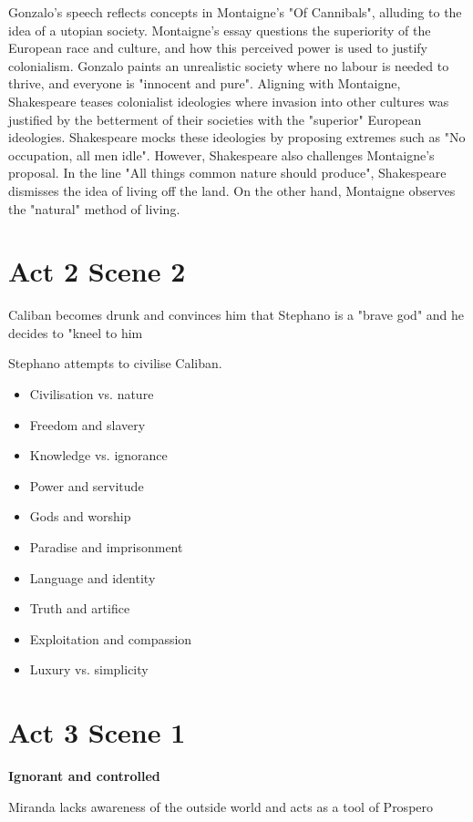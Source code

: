 	Gonzalo's speech reflects concepts in Montaigne's "Of Cannibals", alluding to the idea of a utopian society. Montaigne's essay questions the superiority of the European race and culture, and how this perceived power is used to justify colonialism. Gonzalo paints an unrealistic society where no labour is needed to thrive, and everyone is "innocent and pure". Aligning with Montaigne, Shakespeare teases colonialist ideologies where invasion into other cultures was justified by the betterment of their societies with the "superior" European ideologies. Shakespeare mocks these ideologies by proposing extremes such as "No occupation, all men idle". However, Shakespeare also challenges Montaigne's proposal. In the line "All things common nature should produce", Shakespeare dismisses the idea of living off the land. On the other hand, Montaigne observes the "natural" method of living.

\section{Act 2 Scene 2}

	Caliban becomes drunk and convinces him that Stephano is a "brave god" and he decides to "kneel to him

	Stephano attempts to civilise Caliban.

	\begin{itemize}
		\item Civilisation vs. nature
		\item Freedom and slavery
		\item Knowledge vs. ignorance
		\item Power and servitude
		\item Gods and worship
		\item Paradise and imprisonment
		\item Language and identity
		\item Truth and artifice
		\item Exploitation and compassion
		\item Luxury vs. simplicity
	\end{itemize}

\section{Act 3 Scene 1} \label{26/02/2025}

	\textbf{Ignorant and controlled}

		Miranda lacks awareness of the outside world and acts as a tool of Prospero

